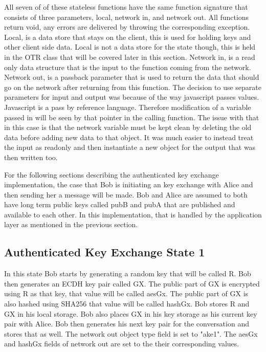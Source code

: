All seven of of these stateless functions have the same function signature that consists of three parameters, local, network in, and network out. All functions return void, any errors are delivered by throwing the corresponding exception. Local, is a data store that stays on the client, this is used for holding keys and other client side data. Local is not a data store for the state though, this is held in the OTR class that will be covered later in this section. Network in, is a read only data structure that is the input to the function coming from the network. Network out, is a passback parameter that is used to return the data that should go on the network after returning from this function. The decision to use separate parameters for input and output was because of the way javascript passes values. Javascript is a pass by reference language. Therefore modification of a variable passed in will be seen by that pointer in the calling function. The issue with that in this case is that the network variable must be kept clean by deleting the old data before adding new data to that object. It was much easier to instead treat the input as readonly and then instantiate a new object for the output that was then written too.


For the following sections describing the authenticated key exchange implementation, the case that Bob is initiating an key exchange with Alice and then sending her a message will be made. Bob and Alice are assumed to both have long term public keys called pubB and pubA that are published and available to each other. In this implementation, that is handled by the application layer as mentioned in the previous section.


\subsection{Authenticated Key Exchange State 1}


In this state Bob starts by generating a random key that will be called R. Bob then generates an ECDH key pair called GX. The public part of GX is encrypted using R as that key, that value will be called aesGx. The public part of GX is also hashed using SHA256 that value will be called hashGx. Bob stores R and GX in his local storage. Bob also places GX in his key storage as his current key pair with Alice. Bob then generates his next key pair for the conversation and stores that as well. The network out object type field is set to "ake1". The aesGx and hashGx fields of network out are set to the their corresponding values.


